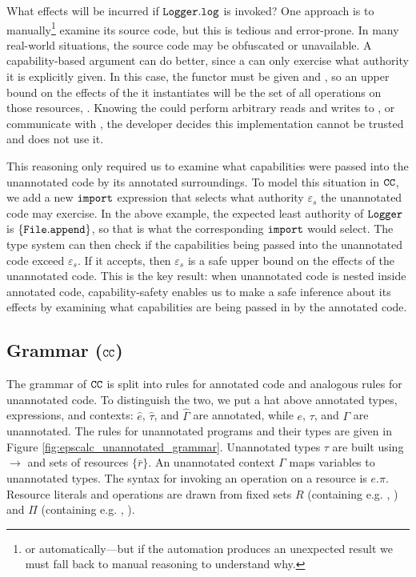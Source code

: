 What effects will be incurred if $\mathtt{Logger.log}$ is invoked? One
approach is to manually\footnote{or automatically---but if the
  automation produces an unexpected result we must fall back to manual
  reasoning to understand why.} examine its source code, but this is
tedious and error-prone. In many real-world situations, the source
code may be obfuscated or unavailable. A capability-based argument can do
better, since a  can only exercise what authority it is explicitly
given. In this case, the  functor must be given  and
, so an upper bound on the effects of the  it
instantiates will be the set of all operations on those resources,
. Knowing the  could perform
arbitrary reads and writes to , or communicate with , the developer decides this implementation cannot be trusted
and does not use it. 

This reasoning only required us to examine what capabilities were passed into
the unannotated code by its annotated surroundings. To model this situation in
$\mathtt{CC}$, we add a new $\mathtt{import}$ expression
that selects what authority $\varepsilon_s$ the unannotated code may
exercise. In the above example, the expected least authority of
$\mathtt{Logger}$ is $\{ \mathtt{File.append} \}$, so that is what the
corresponding $\mathtt{import}$ would select. The type system can then
check if the capabilities being passed into the unannotated code
exceed $\varepsilon_s$. If it accepts, then $\varepsilon_s$ is a safe
upper bound on the effects of the unannotated code. This is the
key result: when unannotated code is nested inside annotated code,
capability-safety enables us to make a safe inference about its
effects by examining what capabilities are being passed in by the
annotated code.

\vspace{-0.5cm}
\subsection{Grammar ($\mathtt{CC}$)}
\vspace{-0.2cm}

The grammar of $\mathtt{CC}$ is split into rules for annotated code and
analogous rules for unannotated code. To distinguish the two, we put a
hat above annotated types, expressions, and contexts: $\hat e$,
$\hat \tau$, and $\hat \Gamma$ are annotated, while $e$, $\tau$, and
$\Gamma$ are unannotated. The rules for unannotated programs and their
types are given in Figure
\ref{fig:epscalc_unannotated_grammar}. Unannotated types $\tau$ are
built using $\rightarrow$ and sets of resources $\{ \bar r \}$. An
unannotated context $\Gamma$ maps variables to unannotated types.
The syntax for invoking an operation on a resource is $e.\pi$. Resource
literals and operations are drawn from fixed sets $R$ (containing e.g.
, ) and $\Pi$ (containing e.g. ,
).

